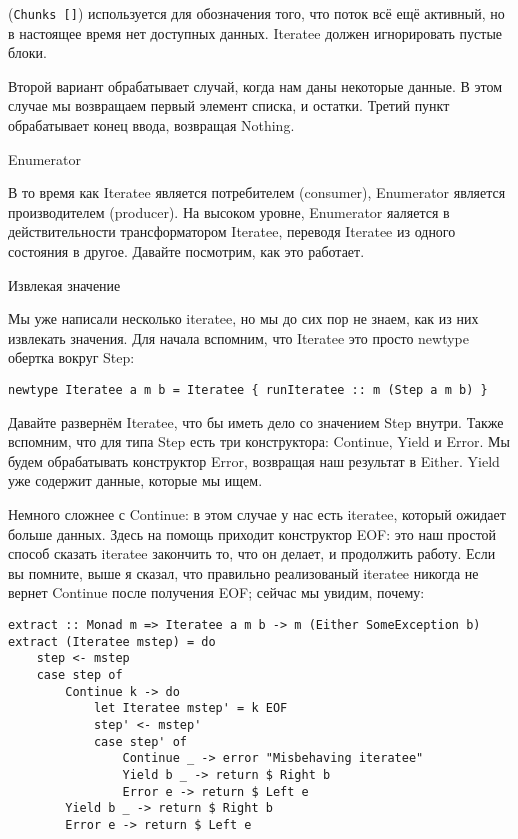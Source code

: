 (\lstinline'Chunks []') используется для обозначения того, что поток всё ещё активный, но в настоящее время нет доступных данных. Iteratee должен игнорировать пустые блоки.

Второй вариант обрабатывает случай, когда нам даны некоторые данные. В этом случае мы возвращаем первый элемент списка, и остатки. Третий пункт обрабатывает конец ввода, возвращая Nothing.

Enumerator

В то время как Iteratee является потребителем (consumer), Enumerator является производителем (producer). На высоком уровне, Enumerator яаляется в действительности трансформатором Iteratee, переводя Iteratee из одного состояния в другое. Давайте посмотрим, как это работает.

Извлекая значение

Мы уже написали несколько iteratee, но мы до сих пор не знаем, как из них извлекать значения. Для начала вспомним, что Iteratee это просто newtype обертка вокруг Step:

\begin{lstlisting}
newtype Iteratee a m b = Iteratee { runIteratee :: m (Step a m b) }
\end{lstlisting}

Давайте развернём Iteratee, что бы иметь дело со значением Step внутри. Также вспомним, что для типа Step есть три конструктора: Continue, Yield и Error. Мы будем обрабатывать конструктор Error, возвращая наш результат в Either. Yield уже содержит данные, которые мы ищем.

Немного сложнее с Continue: в этом случае у нас есть iteratee, который ожидает больше данных. Здесь на помощь приходит конструктор EOF: это наш простой способ сказать iteratee закончить то, что он делает, и продолжить работу. Если вы помните, выше я сказал, что правильно реализованый iteratee никогда не вернет Continue после получения EOF; сейчас мы увидим, почему:

\begin{lstlisting}
extract :: Monad m => Iteratee a m b -> m (Either SomeException b)
extract (Iteratee mstep) = do
    step <- mstep
    case step of
        Continue k -> do
            let Iteratee mstep' = k EOF
            step' <- mstep'
            case step' of
                Continue _ -> error "Misbehaving iteratee"
                Yield b _ -> return $ Right b
                Error e -> return $ Left e
        Yield b _ -> return $ Right b
        Error e -> return $ Left e
\end{lstlisting}

